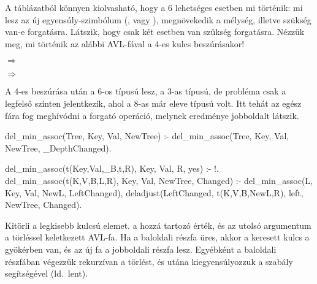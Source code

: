 A  táblázatból könnyen kiolvasható, hogy a
6 lehetséges esetben mi történik: mi lesz az új
egyensúly-szimbólum (\pr{<}, \pr{-} vagy \pr{>}),
megnövekedik a mélység, illetve szükség van-e
forgatásra. Látszik, hogy csak két esetben van
szükség forgatásra. Nézzük meg, mi történik az
alábbi AVL-fával a 4-es kulcs beszúrásakor!

\begin{center}
\begin{minipage}[b][3.3cm][t]{.2\textwidth}
\end{minipage}
\parbox[b][3.3cm][c]{3em}{\center$\Longrightarrow$}
\begin{minipage}[b][3.3cm][t]{.2\textwidth}
\end{minipage}
\parbox[b][3.3cm][c]{3em}{\center$\Longrightarrow$}
\begin{minipage}[b][3.3cm][t]{.3\textwidth}
\end{minipage}
\end{center}
A 4-es beszúrása után a 6-os \pr{<} típusú lesz, a
3-as \pr{>} típusú, de probléma csak a legfelső
szinten jelentkezik, ahol a 8-as már eleve \pr{<}
típusú volt. Itt tehát az egész fára fog meghívódni
a forgató  operáció, melynek
eredménye jobboldalt látszik.

\begin{program*}
del_min_assoc(Tree, Key, Val, NewTree) :-
    del_min_assoc(Tree, Key, Val,
                  NewTree, _DepthChanged).

del_min_assoc(t(Key,Val,_B,t,R), Key, Val,
              R, yes) :- !.
del_min_assoc(t(K,V,B,L,R), Key, Val,
              NewTree, Changed) :-
    del_min_assoc(L, Key, Val, NewL, LeftChanged),
    deladjust(LeftChanged, t(K,V,B,NewL,R),
              left, NewTree, Changed).
\end{program*}
Kitörli a legkisebb kulcsú elemet.  a hozzá
tartozó érték, és az utolsó argumentum a törléssel
keletkezett AVL-fa. Ha a baloldali részfa üres,
akkor a keresett kulcs a gyökérben van, és az új fa
a jobboldali részfa lesz. Egyébként a baloldali
részfában végezzük rekurzívan a törlést, és utána
kiegyensúlyozzuk a  szabály
segítségével (ld.~lent).

